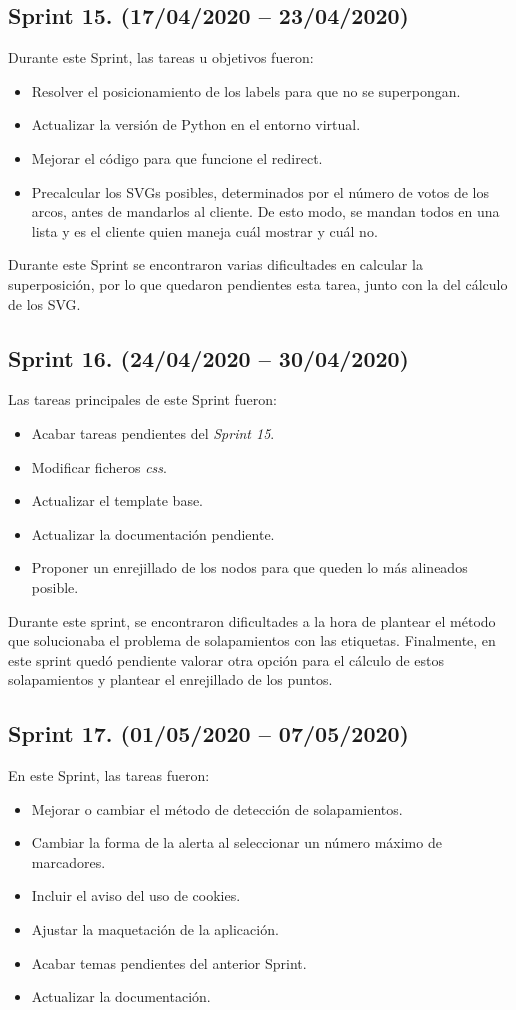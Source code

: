 \subsection{Sprint 15. (17/04/2020 -- 23/04/2020)}
Durante este Sprint, las tareas u objetivos fueron:
\begin{itemize}
	\item Resolver el posicionamiento de los labels para que no se superpongan.
	\item Actualizar la versión de Python en el entorno virtual.
	\item Mejorar el código para que funcione el redirect.
	\item Precalcular los SVGs posibles, determinados por el número de votos de los arcos, antes de mandarlos al cliente. De esto modo, se mandan todos en una lista y es el cliente quien maneja cuál mostrar y cuál no.
\end{itemize}
Durante este Sprint se encontraron varias dificultades en calcular la superposición, por lo que quedaron pendientes esta tarea, junto con la del cálculo de los SVG.

\subsection{Sprint 16. (24/04/2020 -- 30/04/2020)}
Las tareas principales de este Sprint fueron:
\begin{itemize}
	\item Acabar tareas pendientes del \textit{Sprint 15}.
	\item Modificar ficheros \textit{css}.
	\item Actualizar el template base.
	\item Actualizar la documentación pendiente.
	\item Proponer un enrejillado de los nodos para que queden lo más alineados posible.
\end{itemize}
Durante este sprint, se encontraron dificultades a la hora de plantear el método que solucionaba el problema de solapamientos con las etiquetas. Finalmente, en este sprint quedó pendiente valorar otra opción para el cálculo de estos solapamientos y plantear el enrejillado de los puntos.

\subsection{Sprint 17. (01/05/2020 -- 07/05/2020)}
En este Sprint, las tareas fueron:
\begin{itemize}
	\item Mejorar o cambiar el método de detección de solapamientos.
	\item Cambiar la forma de la alerta al seleccionar un número máximo de marcadores.
	\item Incluir el aviso del uso de cookies.
	\item Ajustar la maquetación de la aplicación.
	\item Acabar temas pendientes del anterior Sprint.
	\item Actualizar la documentación.
\end{itemize}

